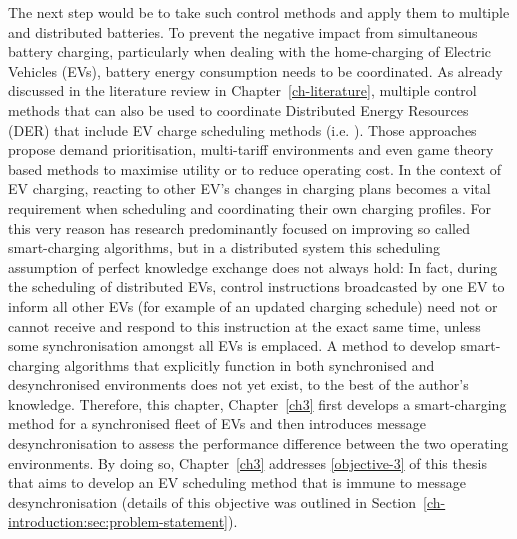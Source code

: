 The next step would be to take such control methods and apply them to multiple and distributed batteries.
To prevent the negative impact from simultaneous battery charging, particularly when dealing with the home-charging of Electric Vehicles (EVs), battery energy consumption needs to be coordinated.
As already discussed in the literature review in Chapter~\ref{ch-literature}, multiple control methods that can also be used to coordinate Distributed Energy Resources (DER) that include EV charge scheduling methods (i.e. \cite{Atia2016, Bidram2012, Bidram2014, Dolan2012, Gill2014, Guerrero2008, Guerrero2013, Sugihara2013, Toledo2013, Wang2016, Vovos2007, Guerrero2013a, Mansouri-Samani1993, Marra2013, Mokhtari2013}). 
Those approaches propose demand prioritisation, multi-tariff environments and even game theory based methods to maximise utility or to reduce operating cost.
In the context of EV charging, reacting to other EV's changes in charging plans becomes a vital requirement when scheduling and coordinating their own charging profiles.
For this very reason has research predominantly focused on improving so called smart-charging algorithms, but in a distributed system this scheduling assumption of perfect knowledge exchange does not always hold:
In fact, during the scheduling of distributed EVs, control instructions broadcasted by one EV to inform all other EVs (for example of an updated charging schedule) need not or cannot receive and respond to this instruction at the exact same time, unless some synchronisation amongst all EVs is emplaced.
A method to develop smart-charging algorithms that explicitly function in both synchronised and desynchronised environments does not yet exist, to the best of the author's knowledge.
Therefore, this chapter, Chapter~\ref{ch3} first develops a smart-charging method for a synchronised fleet of EVs and then introduces message desynchronisation to assess the performance difference between the two operating environments.
By doing so, Chapter~\ref{ch3} addresses \ref{objective-3} of this thesis that aims to develop an EV scheduling method that is immune to message desynchronisation (details of this objective was outlined in Section~\ref{ch-introduction:sec:problem-statement}).

